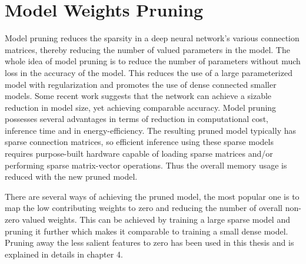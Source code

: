 \section{Model Weights Pruning}

Model pruning reduces the sparsity in a deep neural network's
various connection matrices, thereby reducing the number of valued parameters in the model. The whole idea of model pruning is to reduce the number of parameters without much loss in the accuracy of the model. This reduces the use of a large parameterized model with regularization and promotes the use of dense connected smaller models. Some recent work suggests \cite{DBLP:journals/corr/HanMD15} \cite{DBLP:journals/corr/NarangDSE17} that the network can achieve a sizable reduction in model size, yet achieving comparable accuracy. 
Model pruning possesses several advantages in terms of reduction in computational cost, inference time and in energy-efficiency. The resulting pruned model typically has sparse connection matrices, so
efficient inference using these sparse models requires purpose-built hardware capable of loading sparse matrices and/or performing sparse matrix-vector operations. Thus the overall memory usage is reduced with the new pruned model. 


There are several ways of achieving the pruned model, the most popular one is to map the low contributing weights to zero and reducing the number of overall non-zero valued weights. This can be achieved by training a large sparse model and pruning it further which makes it comparable to training a small dense model. Pruning away the less salient features to zero has been used in this thesis and is explained in details in chapter 4. 


